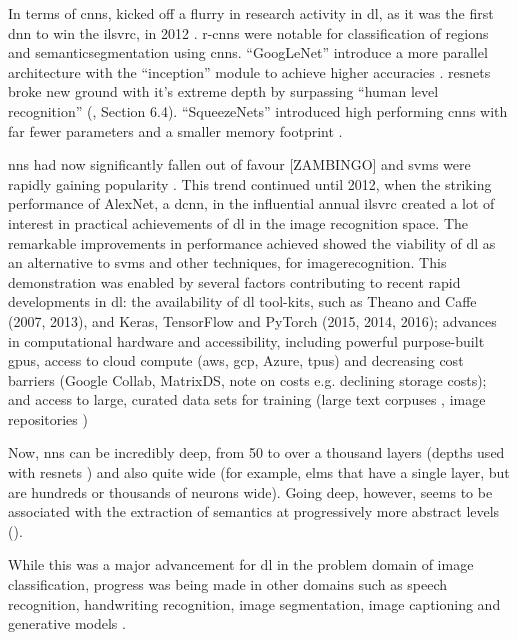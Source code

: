 In terms of \gls{cnn}s, kicked off a flurry in research activity in \gls{dl}, as it was the first \gls{dnn} to win the \gls{ilsvrc}, in 2012 \cite{alexnet} \cite{dl_overview}. \gls{r-cnn}s were notable for classification of regions and \gls{semanticsegmentation} using \gls{cnn}s. \enquote{GoogLeNet} introduce a more parallel architecture with the \enquote{inception} module to achieve higher accuracies \cite{googlenet}. \gls{resnet}s broke new ground with it's extreme depth \cite{resnet} by surpassing \enquote{human level recognition} (\cite{resnet_human}, Section 6.4). \enquote{SqueezeNets} introduced high performing \gls{cnn}s with far fewer parameters and a smaller memory footprint \cite{squeeze_net}. 
\bigskip

\gls{nn}s had now significantly fallen out of favour [ZAMBINGO] and \gls{svm}s were rapidly gaining popularity \cite{svm_nn_comparison}. This trend continued until 2012, when the striking performance of AlexNet, a \gls{dcnn}, in the influential annual \gls{ilsvrc} created a lot of interest in practical achievements of \gls{dl} in the image recognition space. The remarkable improvements in performance achieved showed the viability of \gls{dl} as an alternative to \gls{svm}s and other techniques, for \gls{imagerecognition}. This demonstration was enabled by several factors contributing to recent rapid developments in \gls{dl}: the availability of \gls{dl} tool-kits, such as Theano and Caffe (2007, 2013), and Keras, TensorFlow and PyTorch (2015, 2014, 2016); advances in computational hardware and accessibility, including powerful purpose-built \gls{gpu}s, access to cloud compute (\gls{aws}, \gls{gcp}, Azure, \gls{tpu}s) and decreasing cost barriers (Google Collab, MatrixDS, note on costs e.g. declining storage costs); and access to large, curated data sets for training (large text corpuses \cite{enron_emails}, image repositories \cite{image_net}) \bigskip

Now, \gls{nn}s can be incredibly deep, from 50 to over a thousand layers (depths used with \gls{resnet}s \cite{resnet}) and also quite wide (for example, \gls{elm}s that have a single layer, but are hundreds or thousands of neurons wide). Going deep, however, seems to be associated with the extraction of semantics at progressively more abstract levels (\cite{cnn_semantics}). 
\bigskip


While this was a major advancement for \gls{dl} in the problem domain of image classification, progress was being made in other domains such as speech recognition, handwriting recognition, image segmentation, image captioning and generative models \cite{dl_overview}. 
\bigskip %
 

